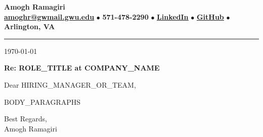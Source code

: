 \documentclass[11pt]{article}
\begin{document}
\begin{center}
    {\LARGE \textbf{Amogh Ramagiri}} \\[6pt]
    \href{mailto:amoghr@gwmail.gwu.edu}{\textbf{amoghr@gwmail.gwu.edu}} $\bullet$
    \textbf{571-478-2290} $\bullet$
    \href{https://www.linkedin.com/in/amoghgr/}{\underline{\textbf{LinkedIn}}} $\bullet$
    \href{https://github.com/itsamoghgr/itsamoghgr}{\underline{\textbf{GitHub}}} $\bullet$
    \textbf{Arlington, VA}
\end{center}

\vspace{4pt}
\hrule
\vspace{1.5em}

\today

\vspace{1em}

\textbf{Re: {{ROLE_TITLE}} at {{COMPANY_NAME}}}

\vspace{1em}

Dear {{HIRING_MANAGER_OR_TEAM}},

\vspace{0.5em}

{{BODY_PARAGRAPHS}}

\vspace{1.5em}

Best Regards, \\
Amogh Ramagiri
\end{document}
